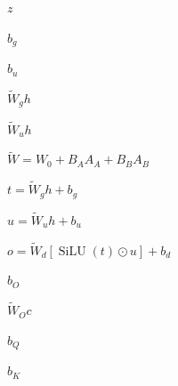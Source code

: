 \documentclass{article}
\begin{document}
\begin{preview}
{\fontsize{22}{26.4}\selectfont\color[HTML]{222222}$\displaystyle z$}
\end{preview}
\begin{preview}
{\fontsize{24}{28.799999999999997}\selectfont\color[HTML]{222222}$\displaystyle b_{g}$}
\end{preview}
\begin{preview}
{\fontsize{24}{28.799999999999997}\selectfont\color[HTML]{222222}$\displaystyle b_{u}$}
\end{preview}
\begin{preview}
{\fontsize{20}{24.0}\selectfont\color[HTML]{222222}$\displaystyle \widetilde{W}_{g}h$}
\end{preview}
\begin{preview}
{\fontsize{20}{24.0}\selectfont\color[HTML]{222222}$\displaystyle \widetilde{W}_{u}h$}
\end{preview}
\begin{preview}
{\fontsize{25}{30.0}\selectfont\color[HTML]{222222}$\displaystyle \widetilde{W} = W_{0} + B_{A}A_{A} + B_{B}A_{B}$}
\end{preview}
\begin{preview}
{\fontsize{24}{28.799999999999997}\selectfont\color[HTML]{222222}$\displaystyle t = \widetilde{W}_{g}h + b_{g}$}
\end{preview}
\begin{preview}
{\fontsize{24}{28.799999999999997}\selectfont\color[HTML]{222222}$\displaystyle u = \widetilde{W}_{u}h + b_{u}$}
\end{preview}
\begin{preview}
{\fontsize{24}{28.799999999999997}\selectfont\color[HTML]{222222}$\displaystyle o = \widetilde{W}_{d}[\operatorname{SiLU}(t) \odot  u] + b_{d}$}
\end{preview}
\begin{preview}
{\fontsize{24}{28.799999999999997}\selectfont\color[HTML]{222222}$\displaystyle b_{O}$}
\end{preview}
\begin{preview}
{\fontsize{20}{24.0}\selectfont\color[HTML]{222222}$\displaystyle \widetilde{W}_{O}c$}
\end{preview}
\begin{preview}
{\fontsize{24}{28.799999999999997}\selectfont\color[HTML]{222222}$\displaystyle b_{Q}$}
\end{preview}
\begin{preview}
{\fontsize{24}{28.799999999999997}\selectfont\color[HTML]{222222}$\displaystyle b_{K}$}
\end{preview}
\end{document}
